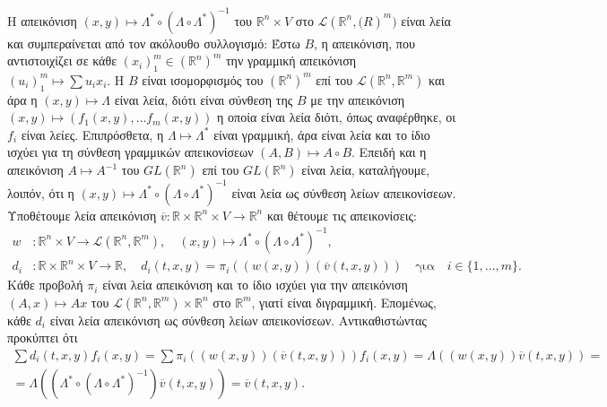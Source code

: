 Η απεικόνιση $\left(x, y\right) \mapsto \Lambda^{\ast} \circ \left(\Lambda \circ
\Lambda^{\ast} \right)^{-1}$ του $\mathbb{R}^{n} \times V$ στο $\mathcal{L}
(\mathbb{R}^{n}, \mathbb(R)^{m})$ είναι λεία και συμπεραίνεται από τον ακόλουθο 
συλλογισμό: Έστω $B$, η απεικόνιση, που αντιστοιχίζει σε κάθε $(x_{i})_1^{m} 
\in 
(\mathbb{R}^{n})^{m}$ την γραμμική απεικόνιση $(u_i)_1^{m} \mapsto 
\sum{u_{i}x_{i}}$. Η $B$ είναι ισομορφισμός του $(\mathbb{R}^{n})^{m}$ επί του 
$\mathcal{L}(\mathbb{R}^{n}, \mathbb{R}^{m})$ και άρα η $(x, y) \mapsto \Lambda$
είναι λεία, διότι είναι σύνθεση της $B$ με την απεικόνιση $\left(x, y\right) 
\mapsto \left(f_1(x, y), \ldots f_m(x, y) \right)$ η οποία είναι λεία διότι, 
όπως αναφέρθηκε, οι $f_i$ είναι λείες. Επιπρόσθετα, η $\Lambda \mapsto \Lambda
^{\ast}$ είναι γραμμική, άρα είναι λεία και το ίδιο ισχύει για τη σύνθεση 
γραμμικών απεικονίσεων $\left(A, B\right) \mapsto A\circ B$. Επειδή και η 
απεικόνιση $A \mapsto A^{-1}$ του $GL\left(\mathbb{R}^n\right)$ επί του 
$GL\left(\mathbb{R}^n\right)$ είναι λεία, καταλήγουμε, λοιπόν, ότι η $(x,y) 
\mapsto \Lambda^{\ast} \circ \left(\Lambda \circ \Lambda^{\ast} \right)^{-1}$ 
είναι λεία ως σύνθεση λείων απεικονίσεων.
Υποθέτουμε λεία απεικόνιση $\overline{v}:\mathbb{R}\times\mathbb{R}^n\times V 
\rightarrow \mathbb{R}^n$ και θέτουμε τις απεικονίσεις:
\begin{align*}
    w&: \mathbb{R}^{n} \times V \rightarrow \mathcal{L}(\mathbb{R}^{n}, 
    \mathbb{R}^{m}),\quad (x, y) \mapsto \Lambda^{\ast} \circ 
    (\Lambda \circ \Lambda^{\ast})^{-1},\\
    d_{i}&:\mathbb{R} \times \mathbb{R}^{n} \times V \rightarrow \mathbb{R} 
        ,\quad d_{i}(t, x, y) = \pi_i\left((w(x,y))(\overline{v}(t,x,y)) 
        \right) \quad \text{για} \quad i \in \{1, \ldots, m\}.
\end{align*}
Κάθε προβολή $\pi_{i}$ είναι λεία απεικόνιση και το ίδιο ισχύει για την 
απεικόνιση $\left(A, x\right) \mapsto Ax$ του $\mathcal{L}\left(\mathbb{R}^{n}, 
\mathbb{R}^{m}\right) \times \mathbb{R}^{n}$ στο $\mathbb{R}^{m}$, γιατί είναι 
διγραμμική. Επομένως, κάθε $d_{i}$ είναι λεία απεικόνιση ως σύνθεση λείων 
απεικονίσεων. Αντικαθιστώντας προκύπτει ότι
\begin{gather*}
    \sum{d_i(t,x,y)f_i(x,y)}=\sum{\pi_{i}\left((w(x,y))(\overline{v}(t,x,y))
    \right) f_i(x,y)} = \Lambda \left( (w(x,y)) \overline{v}(t,x,y)\right) = \\ 
    = \Lambda\left(\left(\Lambda^{\ast} \circ (\Lambda \circ 
        \Lambda^{\ast})^{-1}\right) \overline{v}(t,x,y)\right) = 
        \overline{v}(t,x,y).
\end{gather*}

